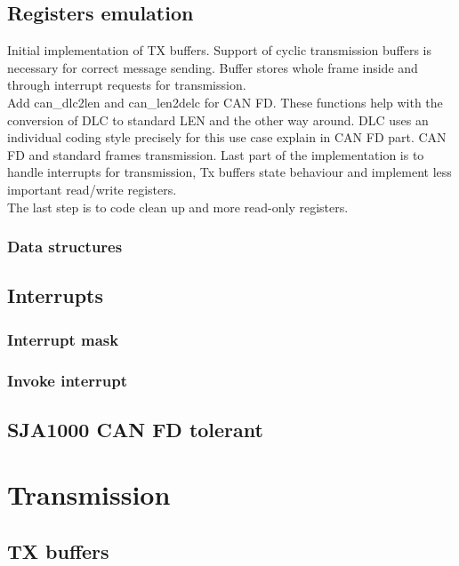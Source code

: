 \documentclass{ctuthesis}
\begin{document}
 \subsection{Registers emulation}
  Initial implementation of TX buffers. Support of cyclic transmission buffers is necessary for correct message sending. Buffer stores whole frame inside and through interrupt requests for transmission. \\
  Add can\_dlc2len and can\_len2delc for CAN FD. These functions help with the conversion of DLC to standard LEN and the other way around. DLC uses an individual coding style precisely for this use case explain in CAN FD part.
  CAN FD and standard frames transmission. Last part of the implementation is to handle interrupts for transmission, Tx buffers state behaviour and implement less important read/write registers. \\
  The last step is to code clean up and more read-only registers.
 
  \subsubsection{Data structures}
 
 \subsection{Interrupts}
 
  \subsubsection{Interrupt mask}
  
  \subsubsection{Invoke interrupt}
 
 \subsection{SJA1000 CAN FD tolerant}

 \section{Transmission}

 \subsection{TX buffers}
\end{document}
